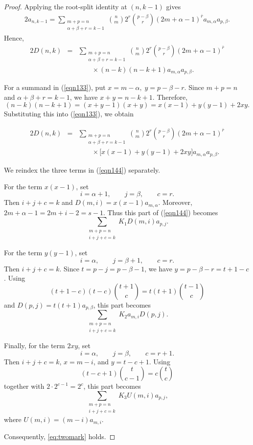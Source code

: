 \documentclass[11pt]{article}
\theoremstyle{definition}
\theoremstyle{remark}
\begin{document}
\begin{proof} 
Applying the root-split identity at $(n,k-1)$ gives
\begin{eqnarray*}
2a_{n,k-1}
=
\sum_{\substack{m+p=n\\ \alpha+\beta+r=k-1}}
\binom{n}{m}2^r
\binom{p-\beta}{r}
(2m+\alpha-1)^{\overline r}
a_{m,\alpha}a_{p,\beta}.
\end{eqnarray*}
Hence,
\begin{eqnarray}
2D(n,k)
&={}&
\sum_{\substack{m+p=n\\ \alpha+\beta+r=k-1}}
\binom{n}{m}2^r
\binom{p-\beta}{r}
(2m+\alpha-1)^{\overline r}  \nonumber\\
& &\qquad{}\times
(n-k)(n-k+1)a_{m,\alpha}a_{p,\beta}.
\label{eqn133}
\end{eqnarray}

For a summand in (\ref{eqn133}), put $
x=m-\alpha,\; y=p-\beta-r$.
Since $m+p=n$ and $\alpha+\beta+r=k-1$, we have 
$x+y=n-k+1$.
Therefore,
\[
(n-k)(n-k+1)
=(x+y-1)(x+y)
=x(x-1)+y(y-1)+2xy.
\]
Substituting this into (\ref{eqn133}), we obtain

\begin{eqnarray}
2D(n,k)
&={}&
\sum_{\substack{m+p=n\\ \alpha+\beta+r=k-1}}
\binom{n}{m}2^r
\binom{p-\beta}{r}
(2m+\alpha-1)^{\overline r}  \nonumber \\
& &\qquad{}\times
\bigl[x(x-1)+y(y-1)+2xy\bigr]
a_{m,\alpha}a_{p,\beta}.
\label{eqn144}
\end{eqnarray}


We reindex the three terms in (\ref{eqn144}) separately.

For the term $x(x-1)$, set
\[
i=\alpha+1,\qquad j=\beta,\qquad c=r.
\]
Then $i+j+c=k$ and
$D(m,i)=x(x-1)a_{m,\alpha}$.
Moreover, $2m+\alpha-1=2m+i-2=s-1$.
Thus this part of (\ref{eqn144}) becomes
\[
\sum_{\substack{m+p=n\\i+j+c=k}}
K_1D(m,i)a_{p,j}.
\]

For the term $y(y-1)$, set
\[
i=\alpha,\qquad j=\beta+1,\qquad c=r.
\]
Then $i+j+c=k$. Since $t=p-j=p-\beta-1$, we have
$y=p-\beta-r=t+1-c$.
Using
\[
(t+1-c)(t-c)\binom{t+1}{c}
=
t(t+1)\binom{t-1}{c}
\]
and $D(p,j)=t(t+1)a_{p,\beta}$,
this part becomes
\[
\sum_{\substack{m+p=n\\i+j+c=k}}
K_2a_{m,i}D(p,j).
\]

Finally, for the term $2xy$, set
\[
i=\alpha,\qquad j=\beta,\qquad c=r+1.
\]
Then $i+j+c=k$, $x=m-i$, and $y=t-c+1$.
Using
\[
(t-c+1)\binom{t}{c-1}
=
c\binom{t}{c}
\]
together with $2\cdot2^{c-1}=2^c$, this part becomes
\[
\sum_{\substack{m+p=n\\i+j+c=k}}
K_3U(m,i)a_{p,j},
\]
where $U(m,i)=(m-i)a_{m,i}$.

 Consequently, \eqref{eq:twomark} holds.
\end{proof}
\end{document}
